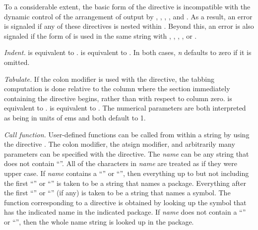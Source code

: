 \begin{flushdesc}
To a considerable extent, the basic form of the directive
 is incompatible with the dynamic control of
the arrangement of output by , \cd{{\Xtilde}\Xunderscore},
, , and .  As
a result, an error is signaled if any of these directives is nested within
.  Beyond this, an error is also signaled if
the  form of
 is used in the same  string with
, \cd{{\Xtilde}\Xunderscore},
, , or .


\item[\cd{{\Xtilde}I}]
\emph{Indent.}  is equivalent to
.   is equivalent to
.  In both cases, \emph{n} defaults to zero
if it is omitted.


\item[\cd{{\Xtilde}:T}] 
\emph{Tabulate.} If the colon modifier is used with the 
directive, the tabbing computation is done relative to the column where the
section immediately containing the directive begins, rather than with
respect to column zero.   is equivalent to
.  
is equivalent to .  The numerical
parameters are both interpreted as being in units of ems and both default
to 1.

\item[\cd{{\Xtilde}/\emph{name}/}]
\emph{Call function.} User-defined functions can be called from within a
 string by using the directive .  The
colon modifier, the atsign modifier, and arbitrarily many parameters can be
specified with the  directive.  The \emph{name}
can be any string that does not contain ``\cdf{/}''.  All of the characters
in \emph{name} are treated as if they were upper case.  If \emph{name}
contains a ``\cd{:}'' or ``\cd{::}'', then everything up to but not
including the first ``\cd{:}'' or ``\cd{::}'' is taken to be a string that
names a package.  Everything after the first ``\cd{:}'' or ``\cd{::}'' (if
any) is taken to be a string that names a symbol.  The function
corresponding to a  directive is obtained by
looking up the symbol that has the indicated name in the indicated package.
If \emph{name} does not contain a ``\cd{:}'' or ``\cd{::}'', then the whole
name string is looked up in the  package.


\end{flushdesc}
